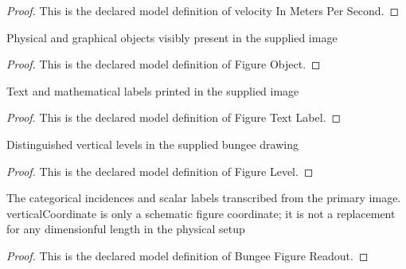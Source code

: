 \begin{proof}
  This is the declared model definition of velocity In Meters Per Second.
\end{proof}
\begin{definition}
  \label{def:physics:phyx-mini-0718:phyxminiproblems-problemphyxmini0718-figureobject}
  Physical and graphical objects visibly present in the supplied image
\end{definition}
\begin{proof}
  This is the declared model definition of Figure Object.
\end{proof}
\begin{definition}
  \label{def:physics:phyx-mini-0718:phyxminiproblems-problemphyxmini0718-figuretextlabel}
  Text and mathematical labels printed in the supplied image
\end{definition}
\begin{proof}
  This is the declared model definition of Figure Text Label.
\end{proof}
\begin{definition}
  \label{def:physics:phyx-mini-0718:phyxminiproblems-problemphyxmini0718-figurelevel}
  Distinguished vertical levels in the supplied bungee drawing
\end{definition}
\begin{proof}
  This is the declared model definition of Figure Level.
\end{proof}
\begin{definition}
  \label{def:physics:phyx-mini-0718:phyxminiproblems-problemphyxmini0718-bungeefigurereadout}
  The categorical incidences and scalar labels transcribed from the primary image. verticalCoordinate is only a schematic figure coordinate; it is not a replacement for any dimensionful length in the physical setup
\end{definition}
\begin{proof}
  This is the declared model definition of Bungee Figure Readout.
\end{proof}
